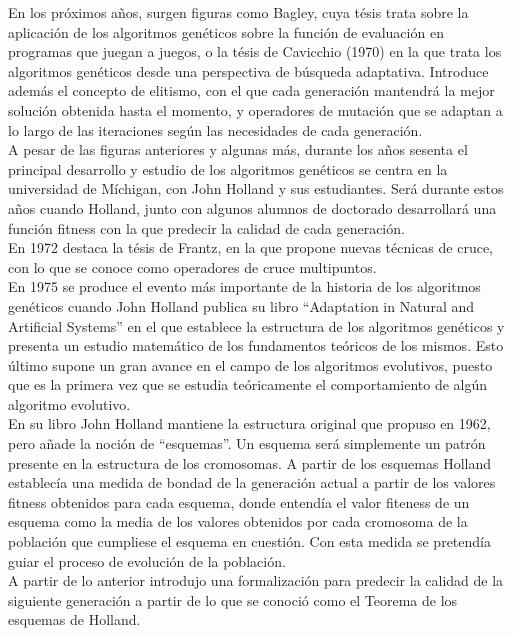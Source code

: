 \documentclass[12pt]{article} \usepackage[utf8]{inputenc}
\begin{document}
En los próximos años, surgen figuras como Bagley, cuya tésis trata
sobre la aplicación de los algoritmos genéticos sobre la función de
evaluación en programas que juegan a juegos, o la tésis de Cavicchio
(1970) en la que trata los algoritmos genéticos desde una perspectiva
de búsqueda adaptativa.  Introduce además el concepto de elitismo, con
el que cada generación mantendrá la mejor solución obtenida hasta el
momento, y operadores de mutación que se
adaptan a lo largo de las iteraciones según las necesidades de cada generación.\\

A pesar de las figuras anteriores y algunas más, durante los años
sesenta el principal desarrollo y estudio de los algoritmos genéticos
se centra en la universidad de Míchigan, con John Holland y sus
estudiantes. Será durante estos años cuando Holland, junto con algunos
alumnos de doctorado desarrollará una
función fitness con la que predecir la calidad de cada generación.\\

En 1972 destaca la tésis de Frantz, en la que propone nuevas técnicas
de cruce,
con lo que se conoce como operadores de cruce multipuntos.\\



En 1975 se produce el evento más importante de la historia de los
algoritmos genéticos cuando John Holland publica su libro ``Adaptation
in Natural and Artificial Systems'' en el que establece la estructura
de los algoritmos genéticos y presenta un estudio matemático de los
fundamentos teóricos de los mismos. Esto último supone un gran avance
en el campo de los algoritmos evolutivos, puesto que es la primera vez
que se estudia teóricamente el
comportamiento de algún algoritmo evolutivo.\\


En su libro John Holland mantiene la estructura original que propuso
en 1962, pero añade la noción de ``esquemas''. Un esquema será
simplemente un patrón presente en la estructura de los cromosomas. A
partir de los esquemas Holland establecía una medida de bondad de la
generación actual a partir de los valores fitness obtenidos para cada
esquema, donde entendía el valor fiteness de un esquema como la media
de los valores obtenidos por cada cromosoma de la población que
cumpliese el esquema en cuestión. Con esta medida se pretendía guiar
el proceso
de evolución de la población. \\

A partir de lo anterior introdujo una formalización para predecir la
calidad de la siguiente generación a partir de lo que se conoció como
el Teorema de los
esquemas de Holland.\\
\end{document}
